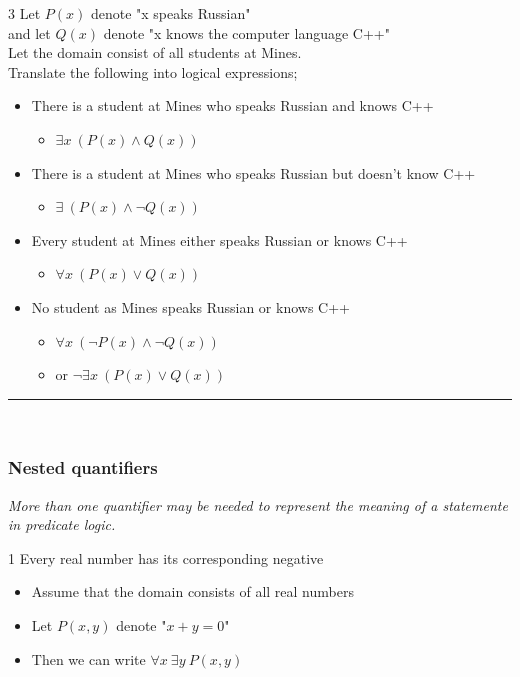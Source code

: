 \documentclass[12pt, letterpaper]{article}
\newcommand{\exheader}[1][ex]{{\tiny{#1}\normalsize}}
\newcommand{\horizline}[0]{\noindent\rule{\textwidth}{1pt}\\}
\begin{document}
\pagebreak

\exheader[3] Let $P(x)$ denote "x speaks Russian" \\
\exheader[\indent] and let $Q(x)$ denote "x knows the computer language C++" \\
\exheader[\indent] Let the domain consist of all students at Mines. \\
\exheader[\indent] Translate the following into logical expressions;
\begin{itemize}[leftmargin=*, label={}]
	\item There is a student at Mines who speaks Russian and knows C++
	\begin{itemize}
		\item $\exists x \ (P(x) \land Q(x))$
	\end{itemize}
	\item There is a student at Mines who speaks Russian but doesn't know C++
	\begin{itemize}
		\item $\exists \ (P(x) \land \neg Q(x))$
	\end{itemize}
	\item Every student at Mines either speaks Russian or knows C++
	\begin{itemize}
		\item $\forall x \ (P(x) \lor Q(x))$
	\end{itemize}
	\item No student as Mines speaks Russian or knows C++
	\begin{itemize}
		\item $\forall x \ (\neg P(x) \land \neg Q(x))$
		\item or $\neg \exists x \ (P(x) \lor Q(x))$
	\end{itemize}
\end{itemize}

\bigbreak
\horizline
\subsubsection*{Nested quantifiers}
\emph{More than one quantifier may be needed to represent the meaning of a statemente in predicate logic.}

\exheader[1] Every real number has its corresponding negative
\begin{itemize}[leftmargin=0.5cm, label={}]
	\item Assume that the domain consists of all real numbers
	\item Let $P(x,y)$ denote "$x + y = 0$"
	\item Then we can write $\forall x \ \exists y \ P(x,y)$
\end{itemize}
\end{document}
